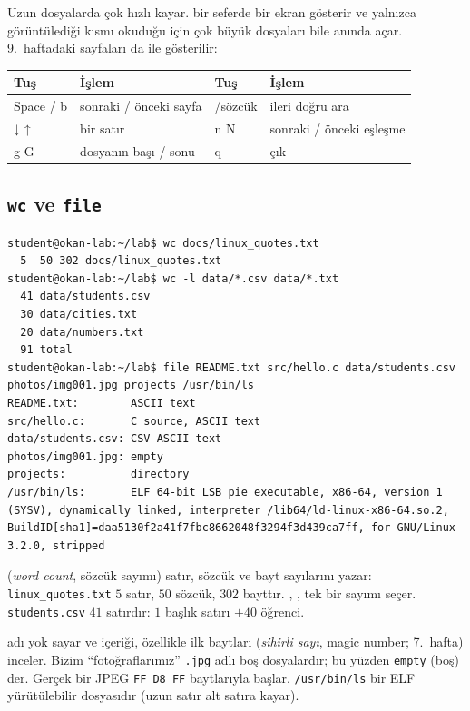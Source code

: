 Uzun dosyalarda  çok hızlı kayar.  bir seferde bir ekran gösterir ve yalnızca görüntülediği kısmı okuduğu için çok büyük dosyaları bile anında açar. 9.~haftadaki  sayfaları da  ile gösterilir:

\begin{center}
\renewcommand{\arraystretch}{1.15}
\begin{tabular}{@{}>{\ttfamily}l l >{\ttfamily}l l@{}}
\toprule
\textrm{\textbf{Tuş}} & \textbf{İşlem} & \textrm{\textbf{Tuş}} & \textbf{İşlem} \\
\midrule
Space / b & sonraki / önceki sayfa & /sözcük & ileri doğru ara \\
↓ ↑ & bir satır & n  N & sonraki / önceki eşleşme \\
g  G & dosyanın başı / sonu & q & çık \\
\bottomrule
\end{tabular}
\end{center}

\subsection{\texttt{wc} ve \texttt{file}}

\begin{lstlisting}[style=term]
student@okan-lab:~/lab$ wc docs/linux_quotes.txt
  5  50 302 docs/linux_quotes.txt
student@okan-lab:~/lab$ wc -l data/*.csv data/*.txt
  41 data/students.csv
  30 data/cities.txt
  20 data/numbers.txt
  91 total
student@okan-lab:~/lab$ file README.txt src/hello.c data/students.csv photos/img001.jpg projects /usr/bin/ls
README.txt:        ASCII text
src/hello.c:       C source, ASCII text
data/students.csv: CSV ASCII text
photos/img001.jpg: empty
projects:          directory
/usr/bin/ls:       ELF 64-bit LSB pie executable, x86-64, version 1 (SYSV), dynamically linked, interpreter /lib64/ld-linux-x86-64.so.2, BuildID[sha1]=daa5130f2a41f7fbc8662048f3294f3d439ca7ff, for GNU/Linux 3.2.0, stripped
\end{lstlisting}

 (\emph{word count}, sözcük sayımı) satır, sözcük ve bayt sayılarını yazar: \texttt{linux\_quotes.txt} $5$ satır, $50$ sözcük, $302$ bayttır. , ,  tek bir sayımı seçer. \texttt{students.csv} $41$ satırdır: $1$ başlık satırı $+ 40$ öğrenci.

 adı yok sayar ve içeriği, özellikle ilk baytları (\emph{sihirli sayı}, magic number; 7.~hafta) inceler. Bizim ``fotoğraflarımız'' \texttt{.jpg} adlı boş dosyalardır; bu yüzden  \texttt{empty} (boş) der. Gerçek bir JPEG \texttt{FF D8 FF} baytlarıyla başlar. \texttt{/usr/bin/ls} bir ELF yürütülebilir dosyasıdır (uzun satır alt satıra kayar).

